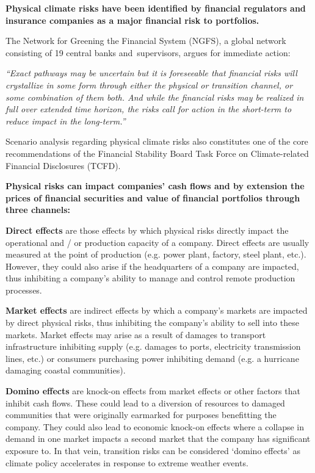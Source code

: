 \documentclass[10pt,table,a4]{article}\usepackage[]{graphicx}\usepackage[]{color}
\begin{document}
	\begin{multicols}{2}
		
		\textbf{Physical climate risks have been identified by financial regulators and insurance companies as a major financial risk to portfolios.}
		
		The Network for Greening the Financial System (NGFS), a global network consisting of 19 central banks and supervisors, argues for immediate action:
		
		\textit{``Exact pathways may be uncertain but it is foreseeable that financial risks will crystallize in some form through either the physical or transition channel, or some combination of them both. And while the financial risks may be realized in full over extended time horizon, the risks call for action in the short-term to reduce impact in the long-term.”}
		
		Scenario analysis regarding physical climate risks also constitutes one of the core recommendations of the Financial Stability Board Task Force on Climate-related Financial Disclosures (TCFD). 
		
		\textbf{Physical risks can impact companies' cash flows and by extension the prices of financial securities and value of financial portfolios through three channels:}
		
		\textbf{Direct effects} are those effects by which physical risks directly impact the operational and / or production capacity of a company. Direct effects are usually measured at the point of production (e.g. power plant, factory, steel plant, etc.). However, they could also arise if the headquarters of a company are impacted, thus inhibiting a company’s ability to manage and control remote production processes. 
		
		\textbf{Market effects} are indirect effects by which a company’s markets are impacted by direct physical risks, thus inhibiting the company’s ability to sell into these markets. Market effects may arise as a result of damages to transport infrastructure inhibiting supply (e.g. damages to ports, electricity transmission lines, etc.) or consumers purchasing power inhibiting demand (e.g. a hurricane damaging coastal communities).
		
		\textbf{Domino effects} are knock-on effects from market effects or other factors that inhibit cash flows. These could lead to a diversion of resources to damaged communities that were originally earmarked for purposes benefitting the company. They could also lead to economic knock-on effects where a collapse in demand in one market impacts a second market that the company has significant exposure to. In that vein, transition risks can be considered ‘domino effects’ as climate policy accelerates in response to extreme weather events. 
		

\end{multicols}
\end{document}
